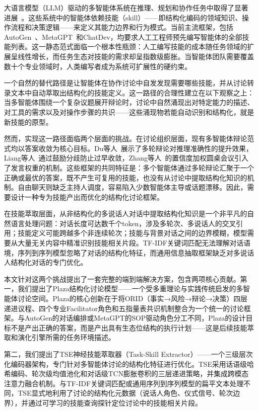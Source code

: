 \documentclass[conference]{IEEEtran}
\begin{document}
大语言模型（LLM）驱动的多智能体系统在推理、规划和协作任务中取得了显著进展~\cite{wu2023autogen,park2023generative,hong2023metagpt}。这些系统中的智能体依赖技能（skill）——即结构化编码的领域知识、操作流程和决策逻辑——来定义其能力边界和行为模式。当前主流框架，包括AutoGen~\cite{wu2023autogen}、MetaGPT~\cite{hong2023metagpt}和ChatDev，均要求人工工程师预先编写智能体的全部技能列表。这一静态范式面临一个根本性瓶颈：人工编写技能的成本随任务领域的扩展呈线性增长，而任务生态对技能的需求却呈指数级膨胀。当智能体团队需要覆盖数十个专业领域时，人类编写者成为系统可扩展性的硬约束。

一个自然的替代路径是让智能体在协作讨论中自发发现需要哪些技能，并从讨论转录文本中自动萃取出结构化的技能定义。这一路径的合理性建立在以下观察之上：当多智能体围绕一个复杂议题展开辩论时，讨论中自然涌现出对特定能力的描述、对工具的需求以及对操作步骤的共识——这些涌现物若能自动识别和结构化，就是新技能的原型。

然而，实现这一路径面临两个层面的挑战。在讨论组织层面，现有多智能体辩论范式均以答案收敛为核心目标。Du等人~\cite{du2023improving}展示了多轮辩论对推理准确性的提升效果，Liang等人~\cite{liang2023encouraging}通过鼓励分歧防止过早收敛，Zhang等人~\cite{zhang2024reconcile}的置信度加权圆桌会议引入了发言权重的机制。这些框架的共同特征是：多个智能体通过多轮辩论汇聚于一个正确或最优的答案，既不产生可复用的技能，也没有从讨论中提取结构化知识的机制。自由聊天则缺乏主持人调度，容易陷入少数智能体主导或话题漂移。因此，需要设计一种专为技能产出而优化的结构化讨论框架。

在技能萃取层面，从非结构化的多说话人对话中提取结构化知识是一个非平凡的自然语言处理问题：对话长度可达数千个token，涉及多轮次、多说话人的交叉引用；技能定义可能跨越多个非连续轮次；技能与背景对话之间的边界模糊，模型需要从大量无关内容中精准识别技能相关片段。TF-IDF关键词匹配无法理解对话语境，序列到序列模型忽略了对话的结构化特征，而通用信息抽取框架缺乏对多说话人结构化对话的专门优化。

本文针对这两个挑战提出了一套完整的端到端解决方案，包含两项核心贡献。第一，我们提出了Plaza结构化讨论模型——一个受多重理论与实践传统启发的多智能体讨论空间。Plaza的核心创新在于将ORID（事实→风险→辩论→决策）四层递进议程、四个专业Facilitator角色和五指量表共识机制整合为一个统一的讨论框架。与AutoGen的对话编排或MetaGPT的SOP驱动角色分工不同，Plaza的设计目标不是产出正确的答案，而是产出具有生态位结构的执行计划——这是后续技能萃取和演化引擎所需的任务环境描述。

第二，我们提出了TSE神经技能萃取器（Task-Skill Extractor）——一个三级层次化编码器架构，专门针对多智能体讨论的结构化特征进行优化。TSE采用话语级哈希编码、轮次级均值池化和对话级TCN膨胀卷积的三层递进策略，并集成跨模态注意力融合机制。与TF-IDF关键词匹配或通用序列到序列模型的扁平文本处理不同，TSE显式地利用了讨论的结构化元数据（说话人角色、仪式信号、轮次边界），并通过可学习的技能查询探针定位讨论中的技能相关片段。
\end{document}
